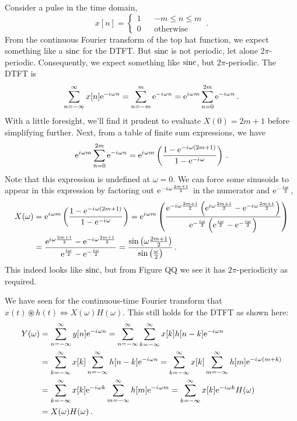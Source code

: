 \begin{exmp}
  Consider a pulse in the time domain,
  \begin{displaymath}
    x[n] = \left\{\begin{array}{ccl}
    1 & & -m \leq n \leq m \\
    0 & & \mathrm{otherwise}
    \end{array}\right. \,.
  \end{displaymath}
  From the continuous Fourier transform of the top hat function, we expect
  something like a $\operatorname{sinc}$ for the DTFT. But $\operatorname{sinc}$ is not periodic, let alone
  $2\pi$-periodic. Consequently, we expect something like $\operatorname{sinc}$, but $2\pi$-periodic.
  The DTFT is
  \begin{displaymath}
    \sum_{n=-\infty}^\infty x[n]\mathrm{e}^{-{i\mkern1mu}\omega n} = \sum_{n=-m}^m \mathrm{e}^{-{i\mkern1mu}\omega n}
    = \mathrm{e}^{{i\mkern1mu}\omega m}\sum_{n=0}^{2m}\mathrm{e}^{-{i\mkern1mu}\omega n} \,.
  \end{displaymath}
  With a little foresight, we'll find it prudent to evaluate
  $X(0) = 2m + 1$ before simplifying further. Next, from a table of finite sum
  expressions, we have
  \begin{displaymath}
    \mathrm{e}^{{i\mkern1mu}\omega m}\sum_{n=0}^{2m}\mathrm{e}^{-{i\mkern1mu}\omega n}
    = \mathrm{e}^{{i\mkern1mu}\omega m}\left(
    \frac{1 - \mathrm{e}^{-{i\mkern1mu}\omega(2m+1)}}{1 - \mathrm{e}^{-{i\mkern1mu}\omega}}
    \right) \,.
  \end{displaymath}
  Note that this expression is undefined at $\omega = 0$. We can force some
  sinusoids to appear in this expression by factoring out $\mathrm{e}^{-{i\mkern1mu}\omega\frac{2m+1}{2}}$
  in the numerator and $\mathrm{e}^{-\frac{{i\mkern1mu}\omega}{2}}$,
  \begin{align*}
    X(\omega) &= \mathrm{e}^{{i\mkern1mu}\omega m}\left(
    \frac{1 - \mathrm{e}^{-{i\mkern1mu}\omega(2m+1)}}{1 - \mathrm{e}^{-{i\mkern1mu}\omega}}
    \right)
    = \mathrm{e}^{{i\mkern1mu}\omega m}\left(
    \frac{\mathrm{e}^{-{i\mkern1mu}\omega\frac{2m+1}{2}}\left(\mathrm{e}^{{i\mkern1mu}\omega\frac{2m+1}{2}}
        - \mathrm{e}^{-{i\mkern1mu}\omega\frac{2m+1}{2}}\right)}{\mathrm{e}^{-\frac{{i\mkern1mu}\omega}{2}}\left(\mathrm{e}^{\frac{{i\mkern1mu}\omega}{2}}
      - \mathrm{e}^{-\frac{{i\mkern1mu}\omega}{2}}\right)}
    \right) \\
    &= 
    \frac{
      \mathrm{e}^{{i\mkern1mu}\omega\frac{2m+1}{2}} - \mathrm{e}^{-{i\mkern1mu}\omega\frac{2m+1}{2}}
    }{
      \mathrm{e}^{\frac{{i\mkern1mu}\omega}{2}} - \mathrm{e}^{-\frac{{i\mkern1mu}\omega}{2}}
    } 
    = \frac{\sin\left(\omega\frac{2m+1}{2}\right)}{\sin\left(\frac{\omega}{2}\right)} \,.
  \end{align*}
  This indeed looks like $\operatorname{sinc}$, but from Figure QQ we see it has
  $2\pi$-periodicity as required.
\end{exmp}
%
We have seen for the continuous-time Fourier transform that
$x(t) \circledast h(t) \Longleftrightarrow X(\omega)H(\omega)$. This still holds for the DTFT
as shown here:
%
\begin{align*}
  Y(\omega) &= \sum_{n=-\infty}^\infty y[n]\mathrm{e}^{-{i\mkern1mu}\omega n} = \sum_{n=-\infty}^\infty\sum_{k=-\infty}^\infty x[k]h[n-k]\mathrm{e}^{-{i\mkern1mu}\omega n} \\
  &= \sum_{k=-\infty}^\infty x[k]\sum_{n=-\infty}^\infty h[n-k]\mathrm{e}^{-{i\mkern1mu}\omega n} = \sum_{k=-\infty}^\infty x[k]\sum_{m=-\infty}^\infty h[m]\mathrm{e}^{-{i\mkern1mu}\omega(m + k)} \\
  &= \sum_{k=-\infty}^\infty x[k]\mathrm{e}^{-{i\mkern1mu}\omega k}\sum_{m=-\infty}^\infty h[m]\mathrm{e}^{-{i\mkern1mu}\omega m} 
  = \sum_{k=-\infty}^\infty x[k]\mathrm{e}^{-{i\mkern1mu}\omega k} H(\omega) \\
  &= X(\omega)H(\omega) \,.
\end{align*}

